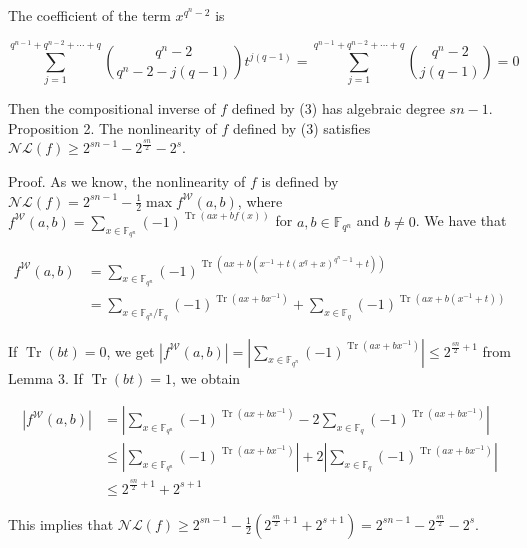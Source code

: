 \documentclass[10pt]{article}
\begin{document}
The coefficient of the term $x^{q^{n}-2}$ is

$$
\sum_{j=1}^{q^{n-1}+q^{n-2}+\cdots+q}\binom{q^{n}-2}{q^{n}-2-j(q-1)} t^{j(q-1)}=\sum_{j=1}^{q^{n-1}+q^{n-2}+\cdots+q}\binom{q^{n}-2}{j(q-1)}=0
$$

Then the compositional inverse of $f$ defined by (3) has algebraic degree $s n-1$.\\
Proposition 2. The nonlinearity of $f$ defined by (3) satisfies $\mathcal{N} \mathcal{L}(f) \geqslant 2^{s n-1}-2^{\frac{s n}{2}}-2^{s}$.

Proof. As we know, the nonlinearity of $f$ is defined by $\mathcal{N} \mathcal{L}(f)=2^{s n-1}-\frac{1}{2} \max f^{\mathcal{W}}(a, b)$, where $f^{\mathcal{W}}(a, b)=\sum_{x \in \mathbb{F}_{q^{n}}}(-1)^{\operatorname{Tr}(a x+b f(x))}$ for $a, b \in \mathbb{F}_{q^{n}}$ and $b \neq 0$. We have that

$$
\begin{aligned}
f^{\mathcal{W}}(a, b) & =\sum_{x \in \mathbb{F}_{q^{n}}}(-1)^{\operatorname{Tr}\left(a x+b\left(x^{-1}+t\left(x^{q}+x\right)^{q^{n}-1}+t\right)\right)} \\
& =\sum_{x \in \mathbb{F}_{q^{n}} / \mathbb{F}_{q}}(-1)^{\operatorname{Tr}\left(a x+b x^{-1}\right)}+\sum_{x \in \mathbb{F}_{q}}(-1)^{\operatorname{Tr}\left(a x+b\left(x^{-1}+t\right)\right)}
\end{aligned}
$$

If $\operatorname{Tr}(b t)=0$, we get $\left|f^{\mathcal{W}}(a, b)\right|=\left|\sum_{x \in \mathbb{F}_{q^{n}}}(-1)^{\operatorname{Tr}\left(a x+b x^{-1}\right)}\right| \leqslant 2^{\frac{s n}{2}+1}$ from Lemma 3. If $\operatorname{Tr}(b t)=1$, we obtain

$$
\begin{aligned}
\left|f^{\mathcal{W}}(a, b)\right| & =\left|\sum_{x \in \mathbb{F}_{q^{n}}}(-1)^{\operatorname{Tr}\left(a x+b x^{-1}\right)}-2 \sum_{x \in \mathbb{F}_{q}}(-1)^{\operatorname{Tr}\left(a x+b x^{-1}\right)}\right| \\
& \leqslant\left|\sum_{x \in \mathbb{F}_{q^{n}}}(-1)^{\operatorname{Tr}\left(a x+b x^{-1}\right)}\right|+2\left|\sum_{x \in \mathbb{F}_{q}}(-1)^{\operatorname{Tr}\left(a x+b x^{-1}\right)}\right| \\
& \leqslant 2^{\frac{s n}{2}+1}+2^{s+1}
\end{aligned}
$$

This implies that $\mathcal{N} \mathcal{L}(f) \geqslant 2^{s n-1}-\frac{1}{2}\left(2^{\frac{s n}{2}+1}+2^{s+1}\right)=2^{s n-1}-2^{\frac{s n}{2}}-2^{s}$.
\end{document}
